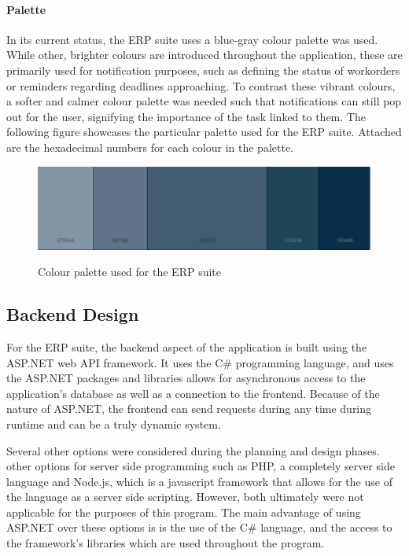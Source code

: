{{{{{{{\paragraph{Palette}
In its current status, the ERP suite uses a blue-gray colour palette was used. While other, brighter colours are introduced throughout the application, these are primarily used for notification purposes, such as defining the status of workorders or reminders regarding deadlines approaching. To contrast these vibrant colours, a softer and calmer colour palette was needed such that notifications can still pop out for the user, signifying the importance of the task linked to them. The following figure showcases the particular palette used for the ERP suite. Attached are the hexadecimal numbers for each colour in the palette. 
\begin{figure}[H]
	\centering
	\includegraphics[width=5in]{palette.png}\\
	\caption{Colour palette used for the ERP suite}
	\label{fig:tobias}
\end{figure}

\subsection{Backend Design}
For the ERP suite, the backend aspect of the application is built using the ASP.NET web API framework. It uses the C\# programming language, and uses the ASP.NET packages and libraries allows for asynchronous access to the application's database as well as a connection to the frontend. Because of the nature of ASP.NET, the frontend can send requests during any time during runtime and can be a truly dynamic system.
\newline
{\setlength{\parindent}{0cm} 

Several other options were considered during the planning and design phases. other options for server side programming such as PHP, a completely server side language and Node.js, which is a javascript framework that allows for the use of the language as a server side scripting. However, both ultimately were not applicable for the purposes of this program. The main advantage of using ASP.NET over these options is is the use of the C\# language, and the access to the framework's libraries which are used throughout the program. 
\newline
{\setlength{\parindent}{0cm} 

}}}}}}}}}

